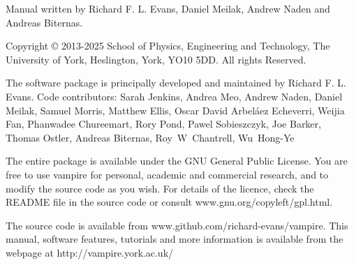 \noindent Manual written by Richard F. L. Evans, Daniel Meilak, Andrew Naden and
Andreas Biternas.\\
\par
\noindent Copyright \copyright \xspace 2013-2025 School of Physics, Engineering and Technology, The
University of York, Heslington, York, YO10 5DD. All rights Reserved.\\
\par
\noindent The \vampire software package is principally developed and maintained
by Richard F. L. Evans. Code contributors: Sarah Jenkins, Andrea Meo, Andrew Naden,
Daniel Meilak, Samuel Morris, Matthew Ellis, Oscar David Arbel\'aez Echeverri,
Weijia Fan, Phanwadee Chureemart, Rory Pond, Pawel Sobieszczyk, Joe Barker,
Thomas Ostler, Andreas Biternas, Roy~W~Chantrell, Wu~Hong-Ye\\
\par
\noindent The entire \vampire package is available under the GNU General
Public License. You are free to use vampire for personal, academic and
commercial research, and to modify the source code as you wish. For details of
the licence, check the README file in the source code or consult
www.gnu.org/copyleft/gpl.html.\\
\par
\noindent The \vampire source code is available from
www.github.com/richard-evans/vampire. This manual, software features, tutorials
and more information is available from the \vampire webpage at
http://vampire.york.ac.uk/\\
